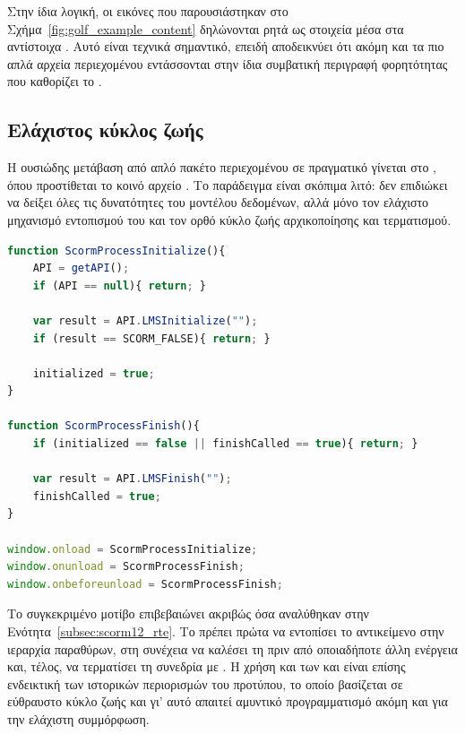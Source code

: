 Στην ίδια λογική, οι εικόνες που παρουσιάστηκαν στο Σχήμα~\ref{fig:golf_example_content} δηλώνονται ρητά ως  στοιχεία μέσα στα αντίστοιχα . Αυτό είναι τεχνικά σημαντικό, επειδή αποδεικνύει ότι ακόμη και τα πιο απλά αρχεία περιεχομένου εντάσσονται στην ίδια συμβατική περιγραφή φορητότητας που καθορίζει το .

\subsection{Ελάχιστος κύκλος ζωής }
\label{subsec:scorm12_api}

Η ουσιώδης μετάβαση από απλό πακέτο περιεχομένου σε πραγματικό  γίνεται στο , όπου προστίθεται το κοινό αρχείο . Το παράδειγμα είναι σκόπιμα λιτό: δεν επιδιώκει να δείξει όλες τις δυνατότητες του μοντέλου δεδομένων, αλλά μόνο τον ελάχιστο μηχανισμό εντοπισμού του  και τον ορθό κύκλο ζωής αρχικοποίησης και τερματισμού.

{\selectfont
\begin{lstlisting}[language=JavaScript, caption={Ελάχιστος \ENG{SCORM} 1.2 \ENG{run-time} κύκλος ζωής}, label={lst:ch4_scorm12_runtime}]
function ScormProcessInitialize(){
    API = getAPI();
    if (API == null){ return; }

    var result = API.LMSInitialize("");
    if (result == SCORM_FALSE){ return; }

    initialized = true;
}

function ScormProcessFinish(){
    if (initialized == false || finishCalled == true){ return; }

    var result = API.LMSFinish("");
    finishCalled = true;
}

window.onload = ScormProcessInitialize;
window.onunload = ScormProcessFinish;
window.onbeforeunload = ScormProcessFinish;
\end{lstlisting}
}

Το συγκεκριμένο μοτίβο επιβεβαιώνει ακριβώς όσα αναλύθηκαν στην Ενότητα~\ref{subsec:scorm12_rte}. Το  πρέπει πρώτα να εντοπίσει το αντικείμενο  στην ιεραρχία παραθύρων, στη συνέχεια να καλέσει τη  πριν από οποιαδήποτε άλλη ενέργεια και, τέλος, να τερματίσει τη συνεδρία με . Η χρήση και των  και  είναι επίσης ενδεικτική των ιστορικών περιορισμών του προτύπου, το οποίο βασίζεται σε εύθραυστο  κύκλο ζωής και γι' αυτό απαιτεί αμυντικό προγραμματισμό ακόμη και για την ελάχιστη συμμόρφωση.

